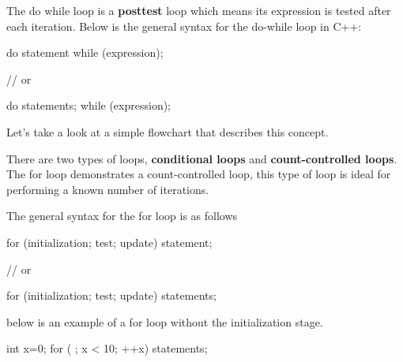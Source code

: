 \documentclass{report}
\begin{document}
    \pagebreak
    \bigbreak \noindent 
    \begin{concept}
 The do while loop is a \textbf{posttest} loop which means its expression is tested after each iteration. Below is the general syntax for the do-while loop in C++:
	\end{concept}
    \bigbreak \noindent 
    
    \begin{cppcode}
do 
    statement
while (expression);

// or 

do {
    statements;
} while (expression);
    \end{cppcode}
    
    \bigbreak \noindent 
    \begin{minipage}[]{0.47\textwidth}
        Let's take a look at a simple flowchart that describes this concept.
    
    \end{minipage}
    \begin{minipage}[]{0.47\textwidth}
    \end{minipage}

    \pagebreak
    \bigbreak \noindent 
    \begin{concept}
 There are two types of loops, \textbf{conditional loops} and \textbf{count-controlled loops}. The for loop demonstrates a count-controlled loop, this type of loop is ideal for performing a known number of iterations.
	\end{concept}
    \bigbreak \noindent 
    The general syntax for the for loop is as follows
    \bigbreak \noindent 
    
    \begin{cppcode}
for (initialization; test; update)  
    statement;

// or

for (initialization; test; update) { 
    statements;
}
    \end{cppcode}
    

    \bigbreak \noindent 
    \bigbreak \noindent 
    below is an example of a for loop without the initialization stage.
    \bigbreak \noindent 
    
    \begin{cppcode}
int x=0;
for ( ; x < 10; ++x) {
    statements;
}

    \end{cppcode}
    
\end{document}
